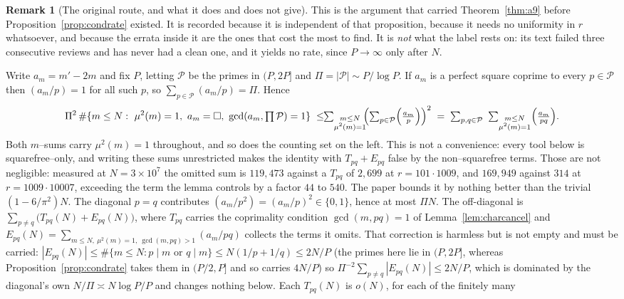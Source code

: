 \documentclass[11pt]{article}
\theoremstyle{definition}
\newtheorem{remark}[theorem]{Remark}
\begin{document}
\begin{remark}[The original route, and what it does and does not give]\label{rem:a9original}
This is the argument that carried Theorem~\ref{thm:a9} before
Proposition~\ref{prop:condrate} existed. It is recorded because it is independent of that
proposition, because it needs no uniformity in $r$ whatsoever, and because the errata inside it are
the ones that cost the most to find. It is \emph{not} what the label rests on: its text failed three
consecutive reviews and has never had a clean one, and it yields no rate, since $P\to\infty$ only
after $N$.

Write $a_m=m'-2m$ and fix $P$, letting $\mathcal{P}$ be the primes in $(P,2P]$ and
$\Pi=|\mathcal{P}|\sim P/\log P$. If $a_m$ is a perfect square coprime to every $p\in\mathcal{P}$
then $(a_m/p)=1$ for all such $p$, so $\sum_{p\in\mathcal{P}}(a_m/p)=\Pi$. Hence
\[ \Pi^2\,\#\{m\le N:\ \mu^2(m)=1,\ a_m=\square,\ \gcd(a_m,\textstyle\prod\mathcal{P})=1\}
   \;\le\!\!\sum_{\substack{m\le N\\ \mu^2(m)=1}}\!\!\Bigl(\sum_{p\in\mathcal{P}}\Bigl(\frac{a_m}{p}\Bigr)\Bigr)^2
   \;=\;\sum_{p,q\in\mathcal{P}}\ \sum_{\substack{m\le N\\ \mu^2(m)=1}}\Bigl(\frac{a_m}{pq}\Bigr). \]
Both $m$--sums carry $\mu^2(m)=1$ throughout, and so does the counting set on the left. This is not
a convenience: every tool below is squarefree--only, and writing these sums unrestricted makes the identity with $T_{pq}+E_{pq}$ false by the non--squarefree terms. Those
are not negligible: measured at $N=3\times10^7$ the omitted sum is $119{,}473$ against a $T_{pq}$ of
$2{,}699$ at $r=101\cdot1009$, and $169{,}949$ against $314$ at $r=1009\cdot10007$, exceeding the
term the lemma controls by a factor $44$ to $540$. The paper bounds it by nothing better than the
trivial $(1-6/\pi^2)N$.
The diagonal $p=q$ contributes $(a_m/p^2)=(a_m/p)^2\in\{0,1\}$, hence at most $\Pi N$. The
off-diagonal is $\sum_{p\ne q}\bigl(T_{pq}(N)+E_{pq}(N)\bigr)$, where $T_{pq}$ carries the
coprimality condition $\gcd(m,pq)=1$ of Lemma~\ref{lem:charcancel} and
$E_{pq}(N)=\sum_{m\le N,\ \mu^2(m)=1,\ \gcd(m,pq)>1}(a_m/pq)$ collects the terms it omits. That
correction is harmless but is not empty and must be carried:
$|E_{pq}(N)|\le\#\{m\le N:p\mid m\text{ or }q\mid m\}\le N(1/p+1/q)\le2N/P$ (the primes here
lie in $(P,2P]$, whereas Proposition~\ref{prop:condrate} takes them in $(P/2,P]$ and so carries
$4N/P$) so
$\Pi^{-2}\sum_{p\ne q}|E_{pq}(N)|\le2N/P$, which is dominated by the diagonal's own $N/\Pi\asymp
N\log P/P$ and changes nothing below. Each $T_{pq}(N)$ is $o(N)$, for each of the finitely many

\end{remark}
\end{document}
